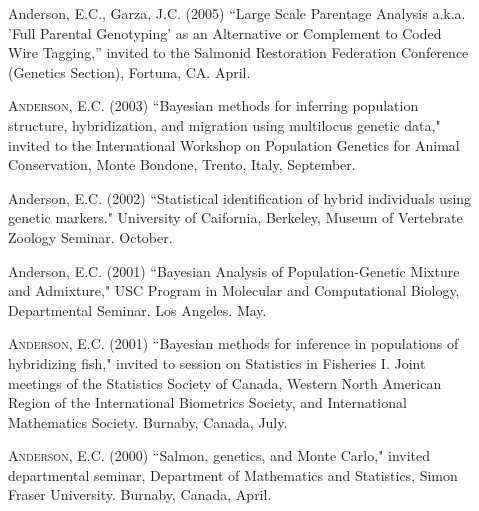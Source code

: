 \documentclass[11pt]{article}
\begin{document}
\begin{description}
\item[] {\sc Anderson, E.C.}, Garza, J.C. (2005) ``Large Scale Parentage Analysis a.k.a. 'Full Parental Genotyping' as an Alternative or Complement to Coded Wire Tagging,'' invited to the Salmonid Restoration Federation Conference (Genetics Section), Fortuna, CA. April.
\item[] \textsc{Anderson, E.C.} (2003) ``Bayesian methods for inferring population structure,
hybridization, and migration using multilocus genetic data," invited to the International Workshop on
Population Genetics for Animal Conservation, Monte Bondone, Trento, Italy, September.
\item[] {\sc Anderson, E.C.} (2002) ``Statistical identification of hybrid individuals using genetic markers." University of Caifornia, Berkeley, Museum of Vertebrate Zoology Seminar.  October.
\item[] {\sc Anderson, E.C.} (2001) ``Bayesian Analysis of Population-Genetic Mixture and Admixture," USC Program in Molecular and Computational Biology, Departmental Seminar. Los Angeles. May.
\item[] \textsc{Anderson, E.C.} (2001) ``Bayesian methods for inference in
populations of hybridizing fish," invited to session on Statistics in
Fisheries I. Joint meetings of the Statistics Society of Canada, Western
North American Region of the International Biometrics Society, and
International Mathematics Society. Burnaby, Canada, July.
\item[] \textsc{Anderson, E.C.} (2000) ``Salmon, genetics, and Monte Carlo," invited departmental
seminar, Department of Mathematics and Statistics, Simon Fraser University. Burnaby, Canada, April.
\end{description}
\end{document}

